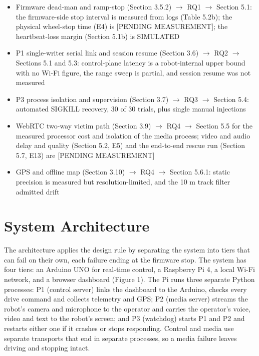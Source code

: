 \begin{itemize}
\item Firmware dead-man and ramp-stop (Section 3.5.2) $\rightarrow$ RQ1 $\rightarrow$ Section 5.1: the firmware-side stop interval is measured from logs (Table 5.2b); the physical wheel-stop time (E4) is [PENDING MEASUREMENT]; the heartbeat-loss margin (Section 5.1b) is SIMULATED
\item P1 single-writer serial link and session resume (Section 3.6) $\rightarrow$ RQ2 $\rightarrow$ Sections 5.1 and 5.3: control-plane latency is a robot-internal upper bound with no Wi-Fi figure, the range sweep is partial, and session resume was not measured
\item P3 process isolation and supervision (Section 3.7) $\rightarrow$ RQ3 $\rightarrow$ Section 5.4: automated SIGKILL recovery, 30 of 30 trials, plus single manual injections
\item WebRTC two-way victim path (Section 3.9) $\rightarrow$ RQ4 $\rightarrow$ Section 5.5 for the measured processor cost and isolation of the media process; video and audio delay and quality (Section 5.2, E5) and the end-to-end rescue run (Section 5.7, E13) are [PENDING MEASUREMENT]
\item GPS and offline map (Section 3.10) $\rightarrow$ RQ4 $\rightarrow$ Section 5.6.1: static precision is measured but resolution-limited, and the 10 m track filter admitted drift
\end{itemize}

\section{System Architecture}

The architecture applies the design rule by separating the system into tiers that can fail on their own, each failure ending at the firmware stop. The system has four tiers: an Arduino UNO for real-time control, a Raspberry Pi 4, a local Wi-Fi network, and a browser dashboard (Figure 1). The Pi runs three separate Python processes: P1 (control server) links the dashboard to the Arduino, checks every drive command and collects telemetry and GPS; P2 (media server) streams the robot's camera and microphone to the operator and carries the operator's voice, video and text to the robot's screen; and P3 (watchdog) starts P1 and P2 and restarts either one if it crashes or stops responding. Control and media use separate transports that end in separate processes, so a media failure leaves driving and stopping intact.

